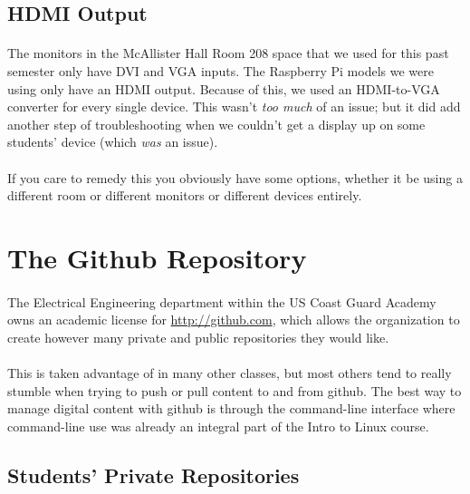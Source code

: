 \documentclass[11pt]{article}
\begin{document}
	\subsection{HDMI Output}

	\paragraph{} The monitors in the McAllister Hall Room 208 space that we used for this past semester only have DVI and VGA inputs. The Raspberry Pi models we were using only have an HDMI output. Because of this, we used an HDMI-to-VGA converter for every single device. This wasn't \textit{too much} of an issue; but it did add another step of troubleshooting when we couldn't get a display up on some students' device (which \textit{was} an issue).

	\paragraph{} If you care to remedy this you obviously have some options,  whether it be using a different room or different monitors or different devices entirely.

	\section{The Github Repository}

	\paragraph{} The Electrical Engineering department within the US Coast Guard Academy owns an academic license for \href{http://github.com}{http://github.com}, which allows the organization to create however many private and public repositories they would like.

	\paragraph{} This is taken advantage of in many other classes, but most others tend to really stumble when trying to push or pull content to and from github. The best way to manage digital content with github is through the command-line interface where command-line use was already an integral part of the Intro to Linux course. 

	\subsection{Students' Private Repositories}
\end{document}
